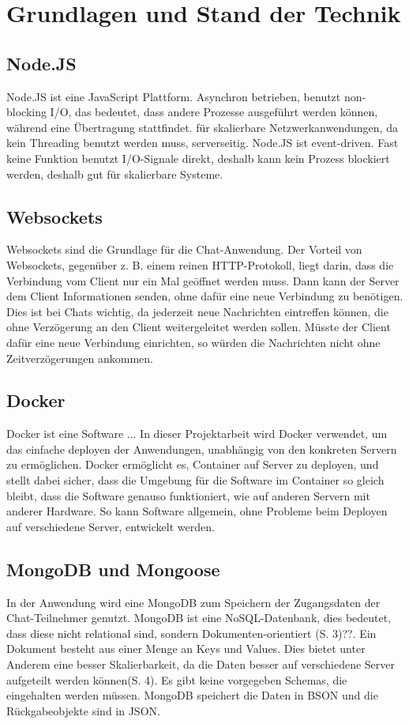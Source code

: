 
\chapter{Grundlagen und Stand der Technik}\label{cha:Grundlagen}
\section{Node.JS}\label{sec:Node.JS}
Node.JS ist eine JavaScript Plattform. Asynchron betrieben, benutzt non-blocking I/O, das bedeutet, dass andere Prozesse ausgeführt werden können, während eine Übertragung stattfindet. für skalierbare Netzwerkanwendungen, da kein Threading benutzt werden muss, serverseitig. Node.JS ist event-driven. Fast keine Funktion benutzt I/O-Signale direkt, deshalb kann kein Prozess blockiert werden, deshalb gut für skalierbare Systeme.


\section{Websockets}\label{sec:Websockets}
Websockets sind die Grundlage für die Chat-Anwendung. Der Vorteil von Websockets, gegenüber z. B. einem reinen \ac{HTTP}-Protokoll, liegt darin, dass die Verbindung vom Client nur ein Mal geöffnet werden muss. Dann kann der Server dem Client Informationen senden, ohne dafür eine neue Verbindung zu benötigen. Dies ist bei Chats wichtig, da jederzeit neue Nachrichten eintreffen können, die ohne Verzögerung an den Client weitergeleitet werden sollen. Müsste der Client dafür eine neue Verbindung einrichten, so würden die Nachrichten nicht ohne Zeitverzögerungen ankommen.
\section{Docker}\label{sec:Docker}
Docker ist eine Software ... In dieser Projektarbeit wird Docker verwendet, um das einfache deployen der Anwendungen, unabhängig von den konkreten Servern zu ermöglichen. Docker ermöglicht es, Container auf Server zu deployen, und stellt dabei sicher, dass die Umgebung für die Software im Container so gleich bleibt, dass die Software genauso funktioniert, wie auf anderen Servern mit anderer Hardware. So kann Software allgemein, ohne Probleme beim Deployen auf verschiedene Server, entwickelt werden.
\section{MongoDB und Mongoose}\label{sec:MongoDB}
In der Anwendung wird eine MongoDB zum Speichern der Zugangsdaten der Chat-Teilnehmer genutzt.
MongoDB ist eine NoSQL-Datenbank, dies bedeutet, dass diese nicht relational sind, sondern Dokumenten-orientiert (S. 3)??. Ein Dokument besteht aus einer Menge an Keys und Values.
Dies bietet unter Anderem eine besser Skalierbarkeit, da die Daten besser auf verschiedene Server aufgeteilt werden können(S. 4). Es gibt keine vorgegeben Schemas, die eingehalten werden müssen. MongoDB speichert die Daten in BSON und die Rückgabeobjekte sind in JSON.

